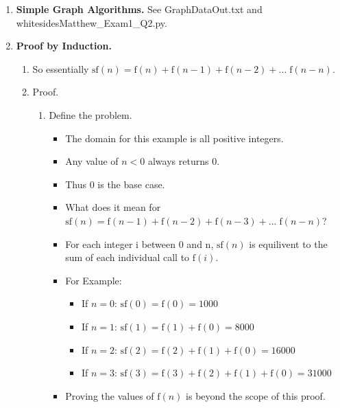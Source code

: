 \documentclass{article}
\begin{document}
\begin{enumerate}
    \item \textbf{Simple Graph Algorithms.} See GraphDataOut.txt and whitesidesMatthew\_Exam1\_Q2.py.
    \item \textbf{Proof by Induction.}
    \begin{enumerate}
      \item So essentially $\textrm{sf}(n) = \textrm{f}(n) + \textrm{f}(n - 1) + \textrm{f}(n - 2) + ...\;\textrm{f}(n - n)$.
      \item Proof.
      \begin{enumerate}
        \item Define the problem.
          \begin{itemize}
            \item The domain for this example is all positive integers. 
            \item Any value of $n < 0$ always returns 0.
            \item Thus 0 is the base case.
            \item What does it mean for $\textrm{sf}(n) = \textrm{f}(n - 1) + \textrm{f}(n - 2) + \textrm{f}(n - 3) + ...\;\textrm{f}(n - n)$?
            \item For each integer i between 0 and n, $\textrm{sf}(n)$ is equilivent to the sum of each individual call to $\textrm{f}(i)$.
            \item For Example:
            \begin{itemize}
              \item If $n = 0$: $\textrm{sf}(0) = \textrm{f}(0) = 1000$
              \item If $n = 1$: $\textrm{sf}(1) = \textrm{f}(1) + \textrm{f}(0) = 8000$
              \item If $n = 2$: $\textrm{sf}(2) = \textrm{f}(2) + \textrm{f}(1) + \textrm{f}(0) = 16000$
              \item If $n = 3$: $\textrm{sf}(3) = \textrm{f}(3) + \textrm{f}(2) + \textrm{f}(1) + \textrm{f}(0) = 31000$
            \end{itemize}
            \item Proving the values of $\textrm{f}(n)$ is beyond the scope of this proof. 
          \end{itemize}
        

\end{enumerate}
\end{enumerate}
\end{enumerate}
\end{document}
